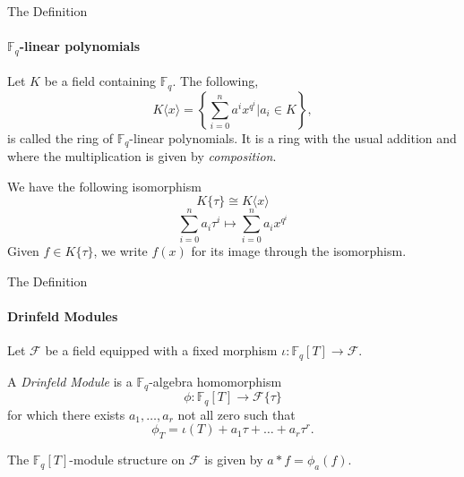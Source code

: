 \begin{frame}[fragile]{The Definition}
	\framesubtitle{$\mathbb{F}_q$-linear polynomials}
        Let $K$ be a field containing $\mathbb{F}_q$. The following,
        $$K\langle x \rangle = \left\{\sum_{i = 0}^n a^i x^{q^i} | a_i \in K \right\},$$
        is called the ring of $\mathbb{F}_q$-linear polynomials.
        It is a ring with the usual addition and where the multiplication is given by \textit{composition}.
        
        We have the following isomorphism
        $$K\{\tau\} \cong K\langle x \rangle$$
        $$\sum_{i = 0}^n a_i \tau^{i} \mapsto \sum_{i = 0}^n a_i x^{q^i}$$
        Given $f \in K\{\tau\}$, we write $f(x)$ for its image through the isomorphism.
\end{frame}

        
	

\begin{frame}[fragile]{The Definition}
	\framesubtitle{Drinfeld Modules}
  Let $\mathcal{F}$ be a field equipped with a fixed morphism $\iota : \mathbb{F}_q[T] \to \mathcal{F}$.
	
	\begin{definition}
            A \textit{Drinfeld Module} is a $\mathbb{F}_q$-algebra homomorphism 
            $$\phi : \mathbb{F}_q[T] \to \mathcal{F}\{\tau\}$$
            for which there exists $a_1,\dots,a_r$ not all zero such that
            $$\phi_T = \iota(T) + a_1\tau + \dots + a_r\tau^r.$$
        \end{definition}
        \pause
        The $\mathbb{F}_q[T]$-module structure on $\mathcal{F}$ is given by $a * f = \phi_a(f)$.  
\end{frame}

